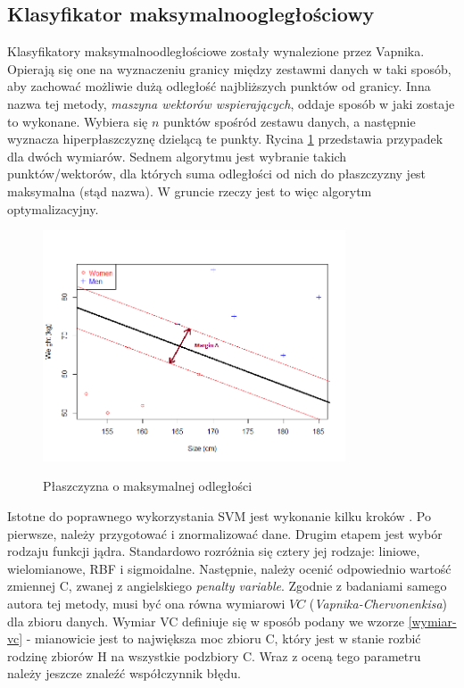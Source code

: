 \documentclass[12pt,a4paper,oneside]{report} %
\begin{document}
\subsection{Klasyfikator maksymalnoogległościowy}

Klasyfikatory maksymalnoodległościowe zostały wynalezione przez Vapnika. Opierają się one na wyznaczeniu granicy między zestawmi danych w taki sposób, aby zachować możliwie dużą odległość najbliższych punktów od granicy. Inna nazwa tej metody, \emph{maszyna wektorów wspierających}, oddaje sposób w jaki zostaje to wykonane. Wybiera się $n$ punktów spośród zestawu danych, a następnie wyznacza hiperpłaszczyznę dzielącą te punkty. Rycina \ref{hyperplane-png} przedstawia przypadek dla dwóch wymiarów. Sednem algorytmu jest wybranie takich punktów/wektorów, dla których suma odległości od nich do płaszczyzny jest maksymalna (stąd nazwa). W gruncie rzeczy jest to więc algorytm optymalizacyjny. \par

\begin{figure}
\centering
\includegraphics[width=0.8\textwidth]{hyperplane.png}
\label{hyperplane-png}
\caption{Płaszczyzna o maksymalnej odległości}
\end{figure}


Istotne do poprawnego wykorzystania SVM jest wykonanie kilku kroków \cite{chih-wei}. Po pierwsze, należy przygotować i znormalizować dane. Drugim etapem jest wybór rodzaju funkcji jądra. Standardowo rozróżnia się cztery jej rodzaje: liniowe, wielomianowe, RBF i sigmoidalne. Następnie, należy ocenić odpowiednio wartość zmiennej C, zwanej z angielskiego \emph{penalty variable}. Zgodnie z badaniami samego autora tej metody, musi być ona równa wymiarowi $VC$ (\emph{Vapnika-Chervonenkisa}) dla zbioru danych. Wymiar VC definiuje się w sposób podany we wzorze \ref{wymiar-vc} - mianowicie jest to największa moc zbioru C, który jest w stanie rozbić rodzinę zbiorów H na wszystkie podzbiory C. Wraz z oceną tego parametru należy jeszcze znaleźć współczynnik błędu. \par
\end{document}

